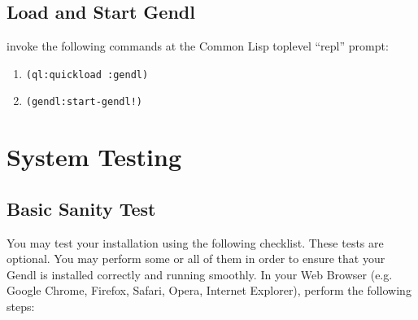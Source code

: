 \documentclass [11pt]{book}
\begin{document}
\subsection{Load and Start Gendl}

\label{subsec:loadandstartgendl}

invoke the following commands at the Common Lisp toplevel ``repl'' prompt:

\begin{enumerate}

\item \texttt{(ql:quickload :gendl)}

\item \texttt{(gendl:start-gendl!)}

\end{enumerate}



\section{System Testing}

\label{sec:systemtesting}



\subsection{Basic Sanity Test}

\label{subsec:basicsanitytest}

You may test your installation using the following
checklist. These tests are optional. You may perform some or all of
them in order to ensure that your Gendl is installed correctly and
running smoothly. In your Web Browser (e.g. Google Chrome, Firefox,
Safari, Opera, Internet Explorer), perform the following steps:
\end{document}

